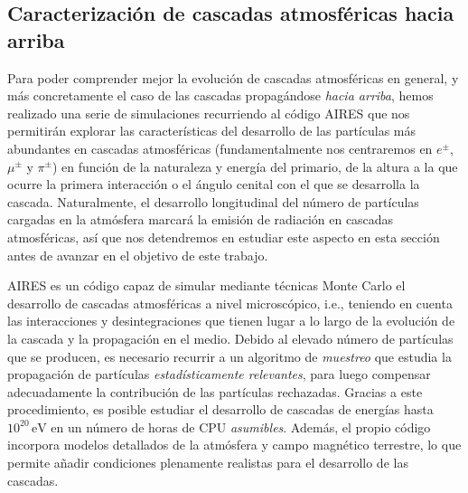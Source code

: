 \documentclass[11 pt, a4paper]{article} %
\numberwithin{equation}{section}
\numberwithin{figure}{section}
\numberwithin{table}{section}
\begin{document}
	\subsection{Caracterización de cascadas atmosféricas hacia arriba}\label{sec22}
	Para poder comprender mejor la evolución de cascadas atmosféricas en general, y más concretamente el caso de las cascadas propagándose \textit{hacia arriba}, hemos realizado una serie de simulaciones recurriendo al código AIRES \cite{https://doi.org/10.13140/rg.2.2.12566.40002} que nos permitirán explorar las características del desarrollo de las partículas más abundantes en cascadas atmosféricas (fundamentalmente nos centraremos en $e^\pm$, $\mu^\pm$ y $\pi^\pm$) en función de la naturaleza y energía del primario, de la altura a la que ocurre la primera interacción o el ángulo cenital con el que se desarrolla la cascada. Naturalmente, el desarrollo longitudinal del número de partículas cargadas en la atmósfera marcará la emisión de radiación en cascadas atmosféricas, así que nos detendremos en estudiar este aspecto en esta sección antes de avanzar en el objetivo de este trabajo.
	
	AIRES es un código capaz de simular mediante técnicas Monte Carlo el desarrollo de cascadas atmosféricas a nivel microscópico, i.e., teniendo en cuenta las interacciones y desintegraciones que tienen lugar a lo largo de la evolución de la cascada y la propagación en el medio. Debido al elevado número de partículas que se producen, es necesario recurrir a un algoritmo de \textit{muestreo} que estudia la propagación de partículas \textit{estadísticamente relevantes}, para luego compensar adecuadamente la contribución de las partículas rechazadas. Gracias a este procedimiento, es posible estudiar el desarrollo de cascadas de energías hasta $10^{20}\,\mathrm{eV}$ en un número de horas de CPU \textit{asumibles}. Además, el propio código incorpora modelos detallados de la atmósfera y campo magnético terrestre, lo que permite añadir condiciones plenamente realistas para el desarrollo de las cascadas.
	
\end{document}
